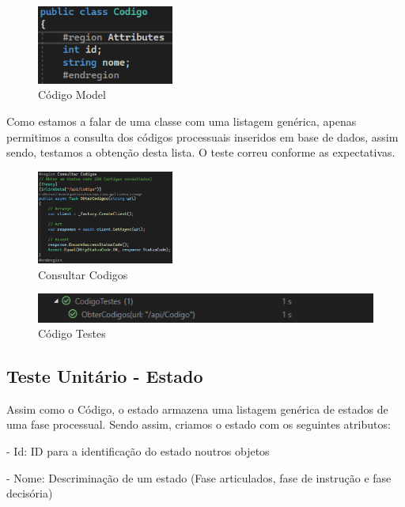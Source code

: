 \begin{figure}[!h]
\centering
\includegraphics[width=0.4\textwidth]{Figuras/Models/CodigoModel.png}
\caption{Código Model}
\label{d.model}
\end{figure}

\indent \par Como estamos a falar de uma classe com uma listagem genérica, apenas permitimos a consulta dos códigos processuais inseridos em base de dados, assim sendo, testamos a obtenção desta lista. O teste correu conforme as expectativas.

\begin{figure}[!h]
\centering
\includegraphics[width=0.4\textwidth]{Figuras/TestesUnitarios/Codigo/Consultar Codigos.png}
\caption{Consultar Codigos}
\label{d.unitario}
\end{figure}

\begin{figure}[!h]
\centering
\includegraphics[width=1\textwidth]{Figuras/Testes/CodigoTestes.png}
\caption{Código Testes}
\label{d.teste}
\end{figure}

\newpage


\subsection{Teste Unitário - Estado}
\indent \par Assim como o Código, o estado armazena uma listagem genérica de estados de uma fase processual. Sendo assim, criamos o estado com os seguintes atributos:
\indent \par - Id: ID para a identificação do estado noutros objetos
\indent \par - Nome: Descriminação de um estado (Fase articulados, fase de instrução e fase decisória)

